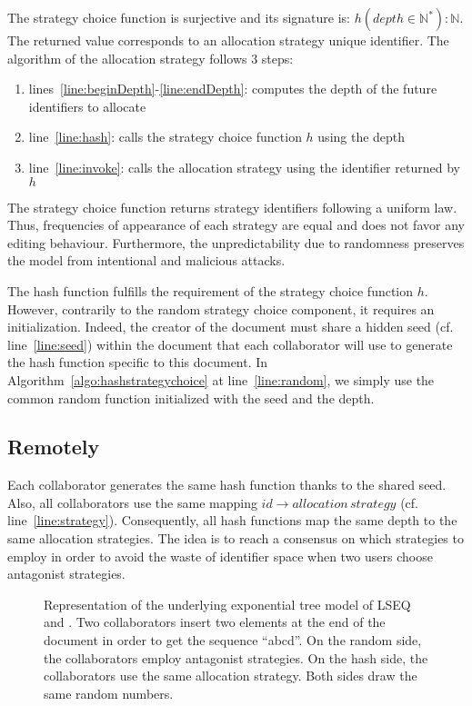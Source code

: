 The strategy choice function is surjective and its signature is: $h(depth \in
\mathbb{N}^*):\mathbb{N}$. The returned value corresponds to an allocation
strategy unique identifier. The algorithm of the allocation strategy \NAME{}
follows 3 steps:
\begin{enumerate}
\item lines~\ref{line:beginDepth}-\ref{line:endDepth}: computes the depth of
  the future identifiers to allocate
\item line~\ref{line:hash}: calls the strategy choice function $h$ using the
  depth
\item line~\ref{line:invoke}: calls the allocation strategy using the
  identifier returned by $h$
\end{enumerate}

The strategy choice function returns strategy identifiers following a uniform
law. Thus, frequencies of appearance of each strategy are equal and does not
favor any editing behaviour. Furthermore, the unpredictability due to
randomness preserves the model from intentional and malicious attacks.

The hash function fulfills the requirement of the strategy choice function $h$.
However, contrarily to the random strategy choice component, it requires
an initialization. Indeed, the creator of the document must share a hidden
seed (cf. line~\ref{line:seed}) within the document that each collaborator
will use to generate the hash function specific to this document. In
Algorithm~\ref{algo:hashstrategychoice} at line~\ref{line:random}, we simply
use the common random function initialized with the seed and the depth.

\subsection{Remotely}

Each collaborator generates the same hash function thanks to the shared
seed. Also, all collaborators use the same mapping $id\rightarrow
allocation\,strategy$ (cf. line~\ref{line:strategy}). Consequently, all hash
functions map the same depth to the same allocation strategies. The idea is to
reach a consensus on which strategies to employ in order to avoid the waste of
identifier space when two users choose antagonist strategies.

\begin{figure}[h]
\begin{center}

\caption{Representation of the underlying exponential tree model of LSEQ and
  \NAME{}. Two collaborators insert two elements at the end of the document in
  order to get the sequence ``abcd''. On the random side, the collaborators
  employ antagonist strategies. On the hash side, the collaborators use the
  same allocation strategy. Both sides draw the same random numbers.}
\label{fig:hashexample}
\end{center}
\end{figure}


